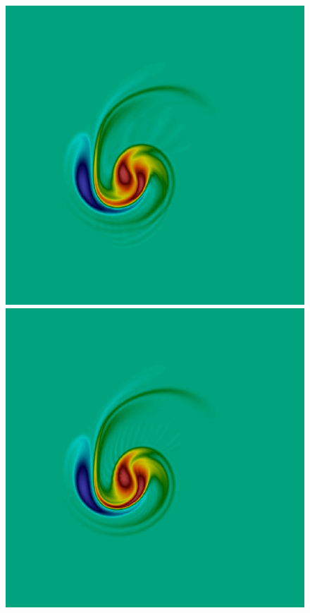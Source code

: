 \begin{figure}[h!]
\includegraphics[scale=0.06]{data/Incompressible_Euler/Snapshots/red_17_4.png}\hspace{1em}
\includegraphics[scale=0.06]{data/Incompressible_Euler/Snapshots/red_35_4.png}\hspace{1em}

\end{figure}

